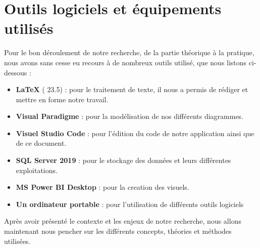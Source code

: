     \section[Outils logiciels et équipements utilisés]{Outils logiciels et équipements utilisés}
    Pour le bon déroulement de notre recherche, de la partie
    théorique à la pratique, nous avons sans cesse eu recours
    à de nombreux outils utilisé, que nous listons ci-dessous :
    \par
        \begin{itemize}
            \setlength{\itemsep}{0pt}
            \item [\ding{226}] \textbf{\LaTeX} ( 23.5) : pour le traitement de texte, il nous a permis de
            rédiger et mettre en forme notre travail.
            \item [\ding{226}] \textbf{Visual Paradigme} : pour la modélisation de nos
            différents diagrammes.
            \item [\ding{226}] \textbf{Visuel Studio Code} : pour l’édition du code de notre application ainsi que de ce document.
            \item [\ding{226}] \textbf{SQL Server 2019} : pour le stockage des données et leurs différentes exploitations.
            \item [\ding{226}] \textbf{MS Power BI Desktop} : pour la creation des visuels.
            \item [\ding{226}] \textbf{Un ordinateur portable} : pour l’utilisation de différents outils
            logiciels
        \end{itemize}
    Après avoir présenté le contexte et les enjeux de notre recherche, nous allons maintenant nous pencher sur
    les différents concepts, théories et méthodes utilisées.